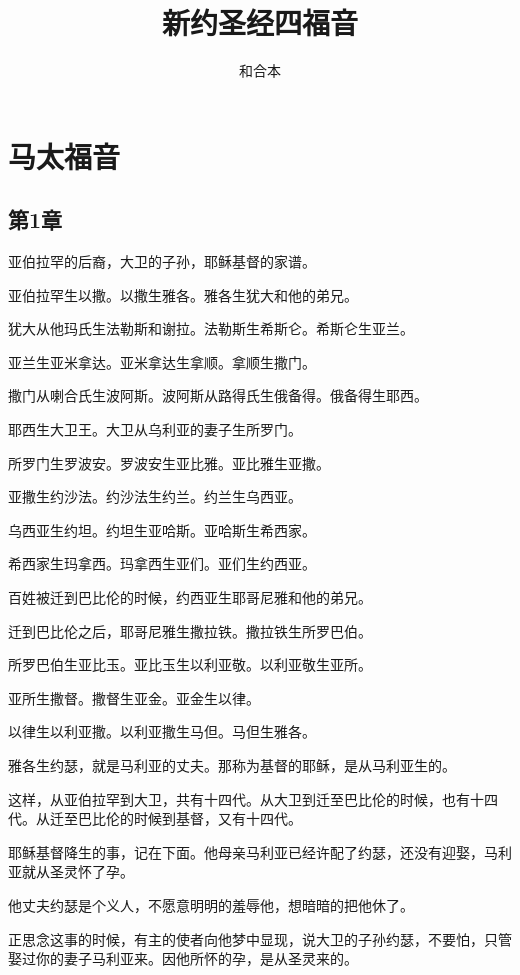 \documentclass[12pt,oneside]{book}
\title{新约圣经四福音}
\author{和合本}
\begin{document}

\frontmatter


\setcounter{tocdepth}{2}    
\tableofcontents

\mainmatter
\part{马太福音}
\chapter{第1章}
亚伯拉罕的后裔，大卫的子孙，耶稣基督的家谱。

亚伯拉罕生以撒。以撒生雅各。雅各生犹大和他的弟兄。

犹大从他玛氏生法勒斯和谢拉。法勒斯生希斯仑。希斯仑生亚兰。

亚兰生亚米拿达。亚米拿达生拿顺。拿顺生撒门。

撒门从喇合氏生波阿斯。波阿斯从路得氏生俄备得。俄备得生耶西。

耶西生大卫王。大卫从乌利亚的妻子生所罗门。

所罗门生罗波安。罗波安生亚比雅。亚比雅生亚撒。

亚撒生约沙法。约沙法生约兰。约兰生乌西亚。

乌西亚生约坦。约坦生亚哈斯。亚哈斯生希西家。

希西家生玛拿西。玛拿西生亚们。亚们生约西亚。

百姓被迁到巴比伦的时候，约西亚生耶哥尼雅和他的弟兄。

迁到巴比伦之后，耶哥尼雅生撒拉铁。撒拉铁生所罗巴伯。

所罗巴伯生亚比玉。亚比玉生以利亚敬。以利亚敬生亚所。

亚所生撒督。撒督生亚金。亚金生以律。

以律生以利亚撒。以利亚撒生马但。马但生雅各。

雅各生约瑟，就是马利亚的丈夫。那称为基督的耶稣，是从马利亚生的。

这样，从亚伯拉罕到大卫，共有十四代。从大卫到迁至巴比伦的时候，也有十四代。从迁至巴比伦的时候到基督，又有十四代。

耶稣基督降生的事，记在下面。他母亲马利亚已经许配了约瑟，还没有迎娶，马利亚就从圣灵怀了孕。

他丈夫约瑟是个义人，不愿意明明的羞辱他，想暗暗的把他休了。

正思念这事的时候，有主的使者向他梦中显现，说大卫的子孙约瑟，不要怕，只管娶过你的妻子马利亚来。因他所怀的孕，是从圣灵来的。
\end{document}
